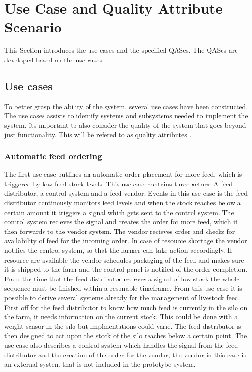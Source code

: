 \section{Use Case and Quality Attribute Scenario}
\label{sec:use_case_and_qas}
This Section introduces the use cases and the specified QASes.
The QASes are developed based on the use cases.

\subsection{Use cases}
\label{sec:use_case}
To better grasp the ability of the system, several use cases have been constructed. The use cases assists to identify systems and subsystems needed to implement the system.
Its important to also consider the quality of the system that goes beyond just functionality. This will be refered to as quality attributes \cite{bass2021software}. \vspace{2mm}

\subsubsection{Automatic feed ordering}
\label{sec:use_case_feed}
The first use case outlines an automatic order placement for more feed, which is triggered by low feed stock levels. This use case contains three actors: A feed distributor, a control system and a feed vendor.
Events in this use case is the feed distributor continously monitors feed levels and when the stock reaches below a certain amount it triggers a signal which gets sent to the control system.
The control system recieves the signal and creates the order for more feed, which it then forwards to the vendor system.
The vendor recieves order and checks for availability of feed for the incoming order. In case of resource shortage the vendor notifies the control system, so that the farmer can take action accordingly.
If resource are available the vendor schedules packaging of the feed and makes sure it is shipped to the farm and the control panel is notified of the order completion. From the time that the feed distributor recieves a signal of low stock the whole sequence must be finished within a resonable timeframe. \vspace{2mm} \newline
From this use case it is possible to derive several systems already for the management of livestock feed. First off for the feed distributor to know how much feed is currently in the silo on the farm, it needs information on the current stock. This could be done with a weight sensor in the silo but implmentations could varie. The feed distributor is then designed to act upon the stock of the silo reaches below a certain point. \vspace{2mm} \newline
The use case also describes a control system which handles the signal from the feed distributor and the creation of the order for the vendor, the vendor in this case is an external system that is not included in the prototybe system.

